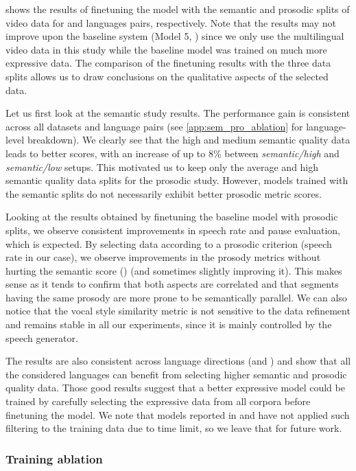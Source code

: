  shows the results of finetuning the model with the semantic and prosodic splits of video data for \xeng and \engx languages pairs, respectively.
Note that the results may not improve upon the baseline system (Model 5, \seamlessexpressive) since we only use the multilingual video data in this study while the baseline model was trained on much more expressive data. 
The comparison of the finetuning results with the three data splits allows us to draw conclusions on the qualitative aspects of the selected data.

Let us first look at the semantic study results. The performance gain is consistent across all datasets and language pairs (see \cref{app:sem_pro_ablation} for language-level breakdown).
We clearly see that the high and medium semantic quality data leads to better \asrbleu scores, with an increase of up to 8\% between \emph{semantic/high} and \emph{semantic/low} setups. 
This motivated us to keep only the average and high semantic quality data splits for the prosodic study.
However, models trained with the semantic splits do not necessarily exhibit better prosodic metric scores.

Looking at the results obtained by finetuning the baseline model with prosodic splits, we observe consistent improvements in speech rate and pause evaluation, which is expected.
By selecting data according to a prosodic criterion (speech rate in our case), we observe improvements in the prosody metrics without hurting the semantic score (\asrbleu) (and sometimes slightly improving it).
This makes sense as it tends to confirm that both aspects are correlated and that segments having the same prosody are more prone to be semantically parallel.
We can also notice that the vocal style similarity metric is not sensitive to the data refinement and remains stable in all our experiments, since it is mainly controlled by the speech generator.

The results are also consistent across language directions (\engx and \xeng) and show that all the considered languages can benefit from selecting higher semantic and prosodic quality data.
Those good results suggest that a better expressive model could be trained by carefully selecting the expressive data from all corpora before finetuning the model. We note that models reported in  and  have not applied such filtering to the training data due to time limit, so we leave that for future work.

\subsubsection{Training ablation}


